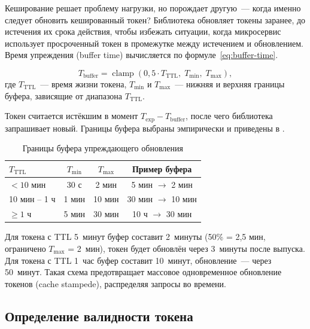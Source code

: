 Кеширование решает проблему нагрузки,
но порождает другую~---
когда именно следует обновить кешированный токен?
Библиотека обновляет токены заранее,
до истечения их срока действия,
чтобы избежать ситуации,
когда микросервис использует просроченный токен
в промежутке между истечением и обновлением.
Время упреждения (buffer time) вычисляется
по формуле~\eqref{eq:buffer-time}.

\begin{equation}\label{eq:buffer-time}
  T_{\text{buffer}} = \operatorname{clamp}\!\left(
    0{,}5 \cdot T_{\text{TTL}},\;
    T_{\text{min}},\;
    T_{\text{max}}
  \right),
\end{equation}
где $T_{\text{TTL}}$~--- время жизни токена,
$T_{\text{min}}$ и $T_{\text{max}}$~---
нижняя и верхняя границы буфера,
зависящие от диапазона $T_{\text{TTL}}$.

Токен считается истёкшим в момент $T_{\text{exp}} - T_{\text{buffer}}$,
после чего библиотека запрашивает новый.
Границы буфера выбраны эмпирически
и приведены в .

\begin{table}[h]
  \centering
  \caption{Границы буфера упреждающего обновления}
  \label{tab:buffer-time}
  \begin{tabular}{l c c c}
    \hline
    $T_{\text{TTL}}$ & $T_{\text{min}}$ & $T_{\text{max}}$ & Пример буфера \\
    \hline
    $< 10$ мин  & 30 с   & 2 мин  & 5 мин $\rightarrow$ 2 мин \\
    10 мин -- 1 ч & 1 мин  & 10 мин & 30 мин $\rightarrow$ 10 мин \\
    $\geq 1$ ч  & 5 мин  & 30 мин & 10 ч $\rightarrow$ 30 мин \\
    \hline
  \end{tabular}
\end{table}

Для токена с TTL 5~минут буфер составит 2~минуты
(50\% = 2,5 мин, ограничено $T_{\text{max}}$ = 2~мин),
токен будет обновлён через 3~минуты после выпуска.
Для токена с TTL 1~час буфер составит 10~минут,
обновление~--- через 50~минут.
Такая схема предотвращает массовое одновременное обновление токенов
(cache stampede), распределяя запросы во времени.

\subsection{Определение валидности токена}\label{subsec:token-validity}

